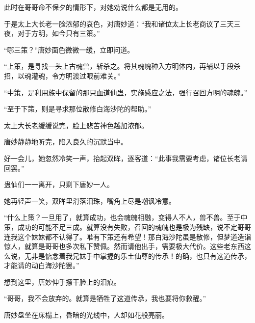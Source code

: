 \begin{this_body}
此时在哥哥命不保夕的情形下，对她劝说什么都是无用的。

于是太上大长老一脸浓郁的哀色，对唐妙道：“我和诸位太上长老商议了三天三夜，对于方明，如今只有三策。”

“哪三策？”唐妙面色微微一缓，立即问道。

“上策，是寻找一头上古魂兽，斩杀之。将其魂魄种入方明体内，再辅以手段杀招，以魂灌魂，令方明渡过眼前难关。”

“中策，是利用族中保留的那只血道仙蛊，实施感应之法，强行召回方明的魂魄。”

“至于下策，则是寻求那位散修白海沙陀的帮助。”

太上大长老缓缓说完，脸上悲苦神色越加浓郁。

唐妙静静地听完，陷入良久的沉默当中。

好一会儿，她忽然冷笑一声，抬起双眸，逐客道：“此事我需要考虑，诸位长老请回罢。”

蛊仙们一一离开，只剩下唐妙一人。

她再轻声一笑，双眸里滑落泪珠，嘴角上尽是嘲讽冷意。

“什么上策？一旦用了，就算成功，也会魂魄相融，变得人不人，兽不兽。至于中策，成功的可能不足三成。就算没有失败，召回的魂魄也是极为残缺，说不定哥哥连我这个妹妹都不认得了。唯有下策还有希望！那白海沙陀虽是散修，但梦道造诣惊人，就算是哥哥也多次私下赞佩。然而请他出手，需要极大代价。这些老东西这么说，无非是惦念着我兄妹手中掌握的乐土仙尊的传承！的确，也只有这道传承，才能请的动白海沙陀罢。”

想到这里，唐妙伸手擦干脸上的泪痕。

“哥哥，我不会放弃的。就算是牺牲了这道传承，我也要将你救醒。”

唐妙盘坐在床榻上，昏暗的光线中，人却如花般亮丽。

\end{this_body}

